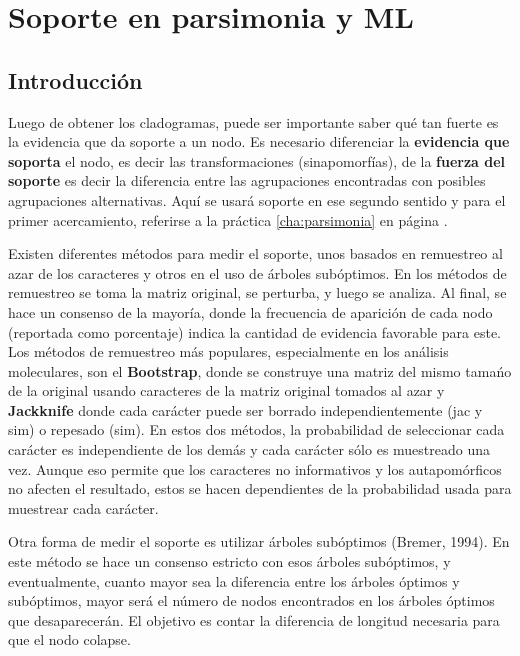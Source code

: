 \chapter{Soporte en parsimonia y ML}
\section*{Introducci\'on}


\label{ch:soporte.pars}
Luego de obtener los cladogramas, puede ser importante saber qu\'e tan fuerte es la evidencia que da soporte a un nodo. Es necesario diferenciar la \textbf{evidencia que soporta} el nodo, es decir las transformaciones (sinapomorf\'ias), de la \textbf{fuerza del soporte} es decir la diferencia entre las agrupaciones encontradas con posibles agrupaciones alternativas. Aqu\'i se usar\'a soporte en ese segundo sentido y para el primer acercamiento, referirse a la pr\'actica \ref{cha:parsimonia} en p\'agina \pageref{cha:parsimonia}.

Existen diferentes m\'etodos para medir el soporte, unos basados en remuestreo al azar de los caracteres y otros en el uso de \'arboles sub\'optimos. En los m\'etodos de remuestreo se toma la matriz original, se perturba, y luego se analiza. Al final, se hace un consenso de la mayor\'ia, donde la frecuencia de aparici\'on de cada nodo (reportada como porcentaje) indica la cantidad de evidencia favorable para este. Los m\'etodos de remuestreo m\'as populares, especialmente en los an\'alisis moleculares, son el \textbf{Bootstrap}, donde se construye una matriz del mismo tama\'no de la original usando caracteres de la matriz original tomados al azar y  \textbf{Jackknife} donde cada car\'acter puede ser borrado independientemente (jac y sim) o repesado (sim). En estos dos m\'etodos, la probabilidad de seleccionar cada car\'acter es independiente de los dem\'as y cada car\'acter s\'olo es muestreado una vez. Aunque eso permite que los caracteres no informativos y los autapom\'orficos no afecten el resultado, estos se hacen dependientes de la probabilidad usada para muestrear cada car\'acter.


Otra forma de medir el soporte es utilizar \'arboles sub\'optimos (Bremer, 1994). En este m\'etodo se hace un consenso estricto con esos \'arboles sub\'optimos, y eventualmente, cuanto mayor sea  la diferencia entre los \'arboles \'optimos y sub\'optimos, mayor ser\'a el n\'umero de nodos encontrados en los \'arboles \'optimos que desaparecer\'an. El objetivo es contar la diferencia de longitud necesaria para que el nodo colapse.


